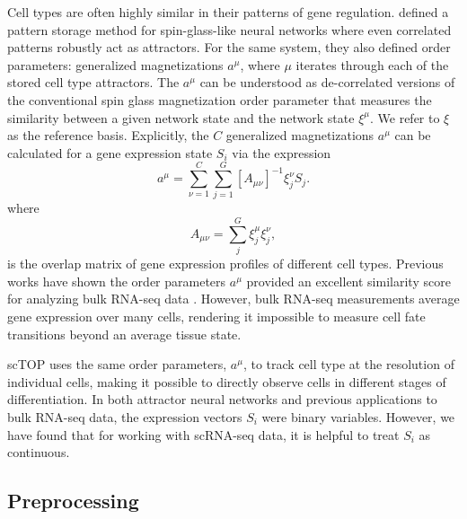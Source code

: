 \documentclass[vruler,JEB]{COB}%
\def\be{\begin{equation}}
\def\ee{\end{equation}}
\begin{document}
Cell types are often highly similar in their patterns of gene regulation. \cite{kanter_associative_1987} defined a pattern storage method for spin-glass-like neural networks where even correlated patterns robustly act as attractors. For the same system, they also defined order parameters: generalized magnetizations $a^{\mu}$, where $\mu$ iterates through each of the stored cell type attractors. The $a^\mu$ can be understood as de-correlated versions of the conventional spin glass magnetization order parameter that measures the similarity between a given network state and the network state $\xi^\mu$. We refer to $\xi$ as the reference basis.
Explicitly, the $C$ generalized magnetizations $a^\mu$ can be calculated for a gene expression state $S_i$ via the expression
\be \label{op_eqn}
a^\mu= \sum_{\nu=1}^C\sum_{j=1}^G [A_{\mu \nu}]^{-1}\xi_j^\nu S_j.
\ee
where
\be
A_{\mu \nu}= \sum_{j}^G  \xi_j^\mu \xi_j^\nu,
\ee
is the overlap matrix of gene expression profiles of different cell types. Previous works have shown the order parameters $a^{\mu}$ provided an excellent similarity score for analyzing bulk RNA-seq data \citep{lang_epigenetic_2014,pusuluri_cellular_2017, dame_thyroid_2017,ikonomou_vivo_2020}. However, bulk RNA-seq measurements average gene expression over many cells, rendering it impossible to measure cell fate transitions beyond an average tissue state. 

scTOP uses the same order parameters, $a^{\mu}$, to track cell type at the resolution of individual cells, making it possible to directly observe cells in different stages of differentiation. In both attractor neural networks and previous applications to bulk RNA-seq data, the expression vectors $S_i$ were binary variables. However, we have found that for working with scRNA-seq data, it is helpful to treat $S_i$ as continuous. 


\subsection{Preprocessing}
\end{document}
